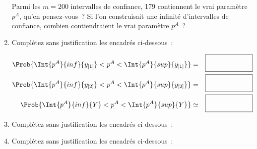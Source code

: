 \documentclass[]{article}
\begin{document}
\begin{exercice}
\begin{enumerate}
Parmi les $m=200$ intervalles de confiance, 179 contiennent le vrai paramètre $p^A$, qu'en pensez-vous~? Si l'on construisait une infinité d'intervalles de confiance, combien contiendraient le vrai paramètre $p^A$~?



\item Complétez sans justification les encadrés ci-dessous~: 

\begin{eqnarray*}
\Prob{ \Int{p^A}{inf}{y_{[1]}} < p^A < \Int{p^A}{sup}{y_{[1]}} } &=&  \fbox{ \phantom{\textbf{\huge pastis}}} \nonumber \\
\Prob{ \Int{p^A}{inf}{y_{[2]}} < p^A < \Int{p^A}{sup}{y_{[2]}} } &=&  \fbox{ \phantom{\textbf{\huge pastis}}} \nonumber \\ 
\Prob{ \Int{p^A}{inf}{Y} < p^A < \Int{p^A}{sup}{Y} } &\simeq&  \fbox{ \phantom{\textbf{\huge pastis}}} \nonumber
\end{eqnarray*}

\item Complétez sans justification les encadrés ci-dessous~:
\item Complétez sans justification les encadrés ci-dessous~:
\end{enumerate}
\end{exercice}
\end{document}

